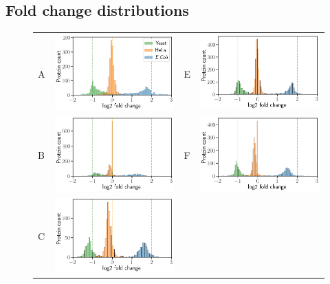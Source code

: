 \documentclass[11pt]{article}
\begin{document}
\subsection*{Fold change distributions}
\begin{figure}[hbt]
    \centering
    \begin{tabular}{lclc} 
        A & \includegraphics[width=0.4\linewidth]{../../result/report_plots/osw_triqler_intensity.png} & 
        E & \includegraphics[width=0.4\linewidth]{../../result/report_plots/diann_triqler_intensity.png} \\ 
        B & \includegraphics[width=0.4\linewidth]{../../result/report_plots/osw_msqrobsum_intensity.png} & 
        F & \includegraphics[width=0.4\linewidth]{../../result/report_plots/diann_msqrobsum_intensity.png} \\ 
        C & \includegraphics[width=0.4\linewidth]{../../result/report_plots/osw_msstats_intensity.png} & 

\end{tabular}
\end{figure}
\end{document}
